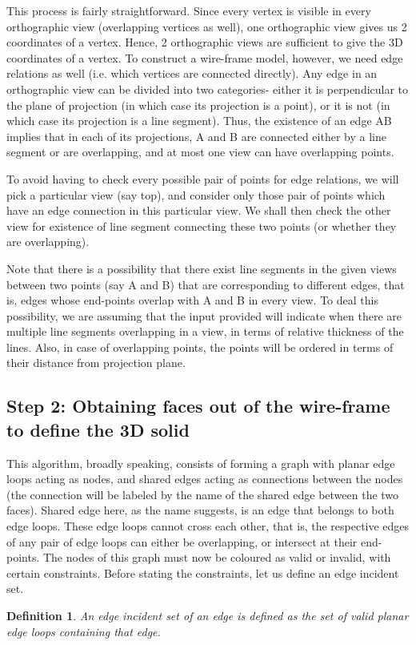 \documentclass[12pt,a4paper]{article}
\newtheorem{definition}{Definition}
\begin{document}
This process is fairly straightforward. Since every vertex is visible in every orthographic view (overlapping vertices as well), one orthographic view gives us 2 coordinates of a vertex. Hence, 2 orthographic views are sufficient to give the 3D coordinates of a vertex. To construct a wire-frame model, however, we need edge relations as well (i.e. which vertices are connected directly). Any edge in an orthographic view can be divided into two categories- either it is perpendicular to the plane of projection (in which case its projection is a point), or it is not (in which case its projection is a line segment). Thus, the existence of an edge AB implies that in each of its projections, A and B are connected either by a line segment or are overlapping, and at most one view can have overlapping points. \newline

To avoid having to check every possible pair of points for edge relations, we will pick a particular view (say top), and consider only those pair of points which have an edge connection in this particular view. We shall then check the other view for existence of line segment connecting these two points (or whether they are overlapping). \newline

Note that there is a possibility that there exist line segments in the given views between two points (say A and B) that are corresponding to different edges, that is, edges whose end-points overlap with A and B in every view. To deal this possibility, we are assuming that the input provided will indicate when there are multiple line segments overlapping in a view, in terms of relative thickness of the lines. Also, in case of overlapping points, the points will be ordered in terms of their distance from projection plane. 

\subsection{Step 2: Obtaining faces out of the wire-frame to define the 3D solid}

This algorithm, broadly speaking, consists of forming a graph with planar edge loops acting as nodes, and shared edges acting as connections between the nodes (the connection will be labeled by the name of the shared edge between the two faces). Shared edge here, as the name suggests, is an edge that belongs to both edge loops. These edge loops cannot cross each other, that is, the respective edges of any pair of edge loops can either be overlapping, or intersect at their end-points. The nodes of this graph must now be coloured as valid or invalid, with certain constraints. Before stating the constraints, let us define an edge incident set.  
\begin{definition}
An edge incident set of an edge is defined as the set of valid planar edge loops containing that edge.     
\end{definition}
\end{document}
